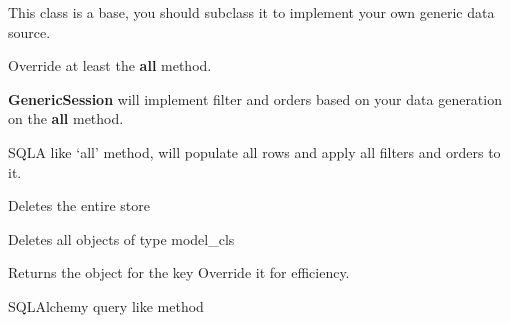 \documentclass[letterpaper,10pt,english]{sphinxmanual}
\begin{document}
\begin{fulllineitems}
\label{api:flask.ext.appbuilder.models.generic.GenericSession}
This class is a base, you should subclass it
to implement your own generic data source.

Override at least the \textbf{all} method.

\textbf{GenericSession} will implement filter and orders
based on your data generation on the \textbf{all} method.

\begin{fulllineitems}
\label{api:flask.ext.appbuilder.models.generic.GenericSession.all}
SQLA like `all' method, will populate all rows and apply all
filters and orders to it.

\end{fulllineitems}


\begin{fulllineitems}
\label{api:flask.ext.appbuilder.models.generic.GenericSession.clear}
Deletes the entire store

\end{fulllineitems}


\begin{fulllineitems}
\label{api:flask.ext.appbuilder.models.generic.GenericSession.delete_all}
Deletes all objects of type model\_cls

\end{fulllineitems}


\begin{fulllineitems}
\label{api:flask.ext.appbuilder.models.generic.GenericSession.get}
Returns the object for the key
Override it for efficiency.

\end{fulllineitems}


\begin{fulllineitems}
\label{api:flask.ext.appbuilder.models.generic.GenericSession.query}
SQLAlchemy query like method

\end{fulllineitems}


\end{fulllineitems}
\end{document}
